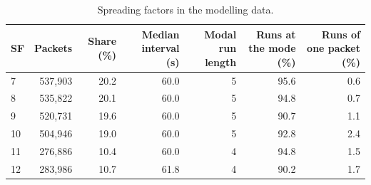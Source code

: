 \begin{table}[t]
\centering
\caption{Spreading factors in the modelling data.}
\label{tab:sf}
\begin{tabular}{lrrrrrr}
\toprule
SF & Packets & Share (\%) & Median interval (s) & Modal run length & Runs at the mode (\%) & Runs of one packet (\%) \\
\midrule
7 & 537,903 & 20.2 & 60.0 & 5 & 95.6 & 0.6 \\
8 & 535,822 & 20.1 & 60.0 & 5 & 94.8 & 0.7 \\
9 & 520,731 & 19.6 & 60.0 & 5 & 90.7 & 1.1 \\
10 & 504,946 & 19.0 & 60.0 & 5 & 92.8 & 2.4 \\
11 & 276,886 & 10.4 & 60.0 & 4 & 94.8 & 1.5 \\
12 & 283,986 & 10.7 & 61.8 & 4 & 90.2 & 1.7 \\
\bottomrule
\end{tabular}
\end{table}
